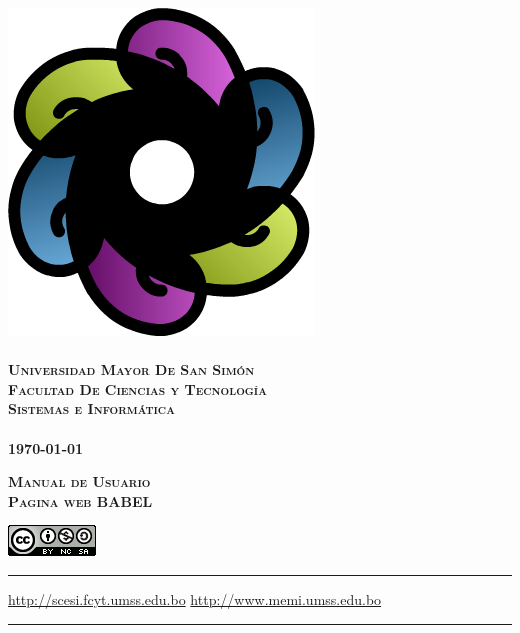 \documentclass[12pt,letterpaper,oneside]{book}
\begin{document}
 \begin{titlepage}
	\thispagestyle{empty}
	\begin{center}
		\includegraphics[scale=0.7]{img/babel.png} \\
		~\\
		\Large{\textsc{\bf Universidad Mayor De San Simón}}\\
		\large{\textsc{\bf Facultad De Ciencias y Tecnología}}\\
		\large{\textsc{\bf Sistemas e Informática}}\\
		~\\
		\small{\bf \today}
	\end{center}
 	\vfill
	\begin{center}
		\Huge{\textsc{\bf Manual de Usuario\\ Pagina web BABEL}}
	\end{center}
	\vfill
	\begin{center}
\includegraphics[scale=0.8]{img/licencia.png}
\end{center}
	\hrule
	\vspace{0.1cm}
	\noindent\small{\url{http://scesi.fcyt.umss.edu.bo} \hfill \url{http://www.memi.umss.edu.bo}}
	\hrule
	\vspace{0.1cm}

\end{titlepage}
\end{document}
